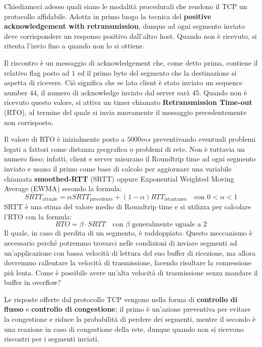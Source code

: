 \noindent Chiediamoci adesso quali siano le modalità procedurali che rendono il TCP un protocollo affidabile. Adotta in primo luogo la tecnica del
\textbf{positive acknowledgement with retransmission}, dunque ad ogni segmento inviato deve corrispondere un responso positivo dall'altro host.
Quando non è ricevuto, si ritenta l'invio fino a quando non lo si ottiene.\par
Il riscontro è un messaggio di acknowledgement che, come detto prima, contiene il relativo flag posto ad $1$ ed il primo byte del segmento che la
destinazione si aspetta di ricevere. Ciò significa che se lato client è stato inviato un sequence number $44$, il numero di acknowledge inviato dal
server sarà $45$. Quando non è ricevuto questo valore, si attiva un timer chiamato \textbf{Retransmission Time-out} (RTO), al termine del quale si invia
nuovamente il messaggio precedentemente non corrisposto.\par
Il valore di RTO è inizialmente posto a $5000ms$ preventivando eventuali problemi legati a fattori come distanza geografica o problemi di rete. Non è
tuttavia un numero fisso; infatti, client e server misurano il Roundtrip time ad ogni segmento inviato e usano il primo come base di calcolo per 
aggiornare una variabile chiamata \textbf{smoothed-RTT} (SRTT) oppure Exponential Weighted Moving Average (EWMA) secondo la formula: \[
SRTT_{\text{attuale}} = \alpha SRTT_{\text{precedente}} + (1-\alpha)RTT_{\text{istantaneo}} \quad\text{con $0 < \alpha < 1$}
\]
\noindent SRTT è una stima del valore medio di Roundtrip time e si utilizza per calcolare l'RTO con la formula: \[
RTO = \beta\cdot SRTT\quad\text{con $\beta$ generalmente uguale a $2$}
\]
\noindent Il quale, in caso di perdita di un segmento, è raddoppiato. Questo meccanismo è necessario perché potremmo trovarci nelle condizioni di
inviare segmenti ad un'applicazione con bassa velocità di lettura del suo buffer di ricezione, ma allora dovremmo rallentare la velocità di trasmissione,
facendo risultare la connessione più lenta. Come è possibile avere un'alta velocità di trasmissione senza mandare il buffer in overflow?\par
Le risposte offerte dal protocollo TCP vengono nella forma di \textbf{controllo di flusso} e \textbf{controllo di congestione}; il primo è un'azione
preventiva per evitare la congestione e riduce la probabilità di perdere dei segmenti, mentre il secondo è una reazione in caso di congestione della
rete, dunque quando non si ricevono riscontri per i segmenti inviati.\newline

